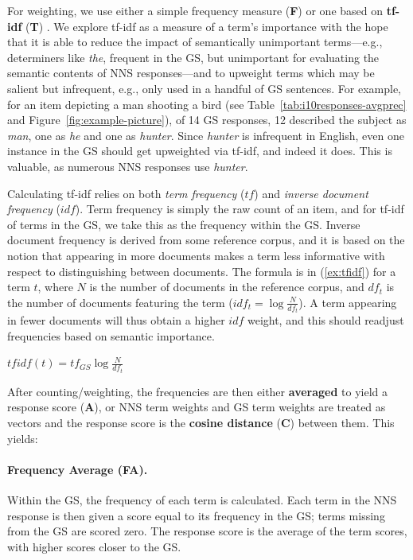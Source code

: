 For weighting, we use either a simple frequency measure (\textbf{F})
or one based on \textbf{tf-idf} (\textbf{T})
\citep[][ch. 6]{manning-et-al:08}.  We explore tf-idf as a measure of
a term's importance with the hope that it is able to reduce the impact
of semantically unimportant terms---e.g., determiners like
\textit{the}, frequent in the GS, but unimportant for evaluating the
semantic contents of NNS responses---and to upweight terms which may
be salient but infrequent, e.g., only used in a handful of GS
sentences. For example, for an item depicting a man shooting a bird
(see Table~\ref{tab:i10responses-avgprec} and Figure~\ref{fig:example-picture}), of 14 GS responses, 12
described the subject as \textit{man}, one as \textit{he} and one as
\textit{hunter}. Since \textit{hunter} is infrequent in English, even
one instance in the GS should get upweighted via tf-idf, and indeed it
does. 
This is valuable, as numerous NNS responses use \textit{hunter}.

Calculating tf-idf relies on both \emph{term frequency} ($tf$) and
\emph{inverse document frequency} ($idf$).  Term frequency is simply
the raw count of an item, and for tf-idf of terms in the GS, we take
this as the frequency within the GS.  Inverse document frequency is
derived from some reference corpus, and it is based on the notion that
appearing in more documents makes a term less informative with respect
to distinguishing between documents.  The formula is in
(\ref{ex:tfidf}) for a term $t$, where $N$ is the number of documents
in the reference corpus, and $df_{t}$ is the number of documents
featuring the term ($idf_{t} = \log \frac{N}{df_{t}}$).  A term
appearing in fewer documents will thus obtain a higher $idf$ weight,
and this should readjust frequencies based on semantic importance.

\begin{exe}
\ex\label{ex:tfidf} $tfidf(t) = tf_{GS} \log \frac{N}{df_{t}}$
\end{exe}

After counting/weighting, the frequencies are then either
\textbf{averaged} to yield a response score (\textbf{A}), or NNS term
weights and GS term weights are treated as vectors and the response
score is the \textbf{cosine distance} (\textbf{C}) between them.  This
yields:

\paragraph{Frequency Average (FA).} 
Within the GS, the frequency of each term is calculated. Each term in
the NNS response is then given a score equal to its frequency in the
GS; terms missing from the GS are scored zero. The response score is
the average of the term scores, with higher scores closer to the GS.

